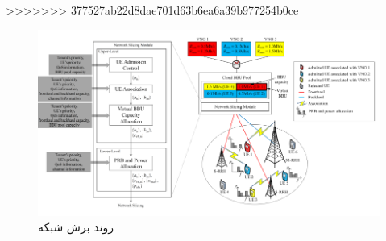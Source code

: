 >>>>>>> 377527ab22d8dae701d63b6ea6a39b977254b0ce
\begin{figure}[H]
  \centering
    \includegraphics[scale = 0.7]{./fig/dynamicNS}
  \caption{روند برش شبکه\ \cite{lee2018dynamic}}
  \label{fig:dns}
\end{figure}
